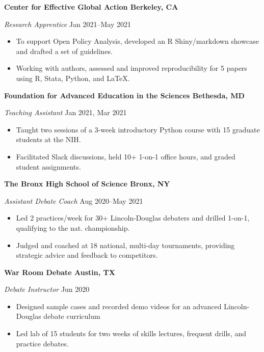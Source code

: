 \documentclass[11pt]{article}
\begin{document}
\textbf{Center for Effective Global Action \hfill Berkeley, CA}\par

\textit{Research Apprentice} \hfill Jan 2021--May 2021
\begin{itemize}
	\item To support Open Policy Analysis, developed an R Shiny/markdown showcase and drafted a set of guidelines.
	\item Working with authors, assessed and improved reproducibility for 5 papers using R, Stata, Python, and \LaTeX.
\end{itemize}\par

\textbf{Foundation for Advanced Education in the Sciences \hfill Bethesda, MD} \par
\textit{Teaching Assistant} \hfill Jan 2021, Mar 2021 \par
\begin{itemize}
	\item Taught two sessions of a 3-week introductory Python course with 15 graduate students at the NIH.
	\item Facilitated Slack discussions, held 10+ 1-on-1 office hours, and graded student assignments.
\end{itemize}\vspace{0.1cm}

\textbf{The Bronx High School of Science \hfill Bronx, NY} \par
\textit{Assistant Debate Coach}  \hfill Aug 2020--May 2021
\begin{itemize}
	\item Led 2 practices/week for 30+ Lincoln-Douglas debaters and drilled 1-on-1, qualifying to the nat. championship. 
	\item Judged and coached at 18 national, multi-day tournaments, providing strategic advice and feedback to competitors.
\end{itemize}\vspace{0.1cm}

\textbf{War Room Debate \hfill Austin, TX} \par
\textit{Debate Instructor}  \hfill Jun 2020 \par
\begin{itemize}
	\item Designed sample cases and recorded demo videos for an advanced Lincoln-Douglas debate curriculum
	\item Led lab of 15 students for two weeks of skills lectures, frequent drills, and practice debates.
\end{itemize}\vspace{0.1cm}
\end{document}
